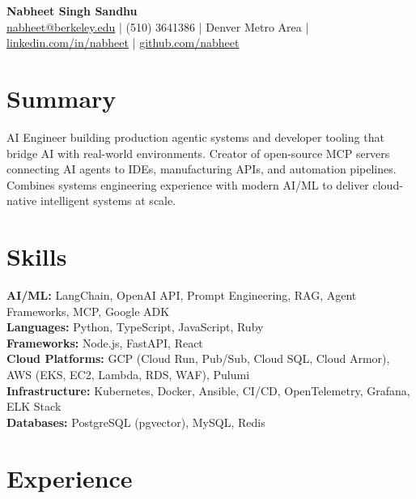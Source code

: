\documentclass[11pt,letterpaper]{article}
\begin{document}
{\Huge \bfseries Nabheet Singh Sandhu} \\[4pt]
\href{mailto:nabheet@berkeley.edu}{nabheet@berkeley.edu} \; | \;
(510) 364\textendash{}1386 \; |\;
Denver Metro Area \;|\;
\href{https://linkedin.com/in/nabheet}{linkedin.com/in/nabheet} \;|\;
\href{https://github.com/nabheet}{github.com/nabheet}

\section*{Summary}
AI Engineer building production agentic systems and developer tooling that bridge AI with real-world environments. Creator of open-source MCP servers connecting AI agents to IDEs, manufacturing APIs, and automation pipelines. Combines systems engineering experience with modern AI/ML to deliver cloud-native intelligent systems at scale.

\section*{Skills}
\textbf{AI/ML:} LangChain, OpenAI API, Prompt Engineering, RAG, Agent Frameworks, MCP, Google ADK \\
\textbf{Languages:} Python, TypeScript, JavaScript, Ruby \\
\textbf{Frameworks:} Node.js, FastAPI, React \\
\textbf{Cloud Platforms:} GCP (Cloud Run, Pub/Sub, Cloud SQL, Cloud Armor), AWS (EKS, EC2, Lambda, RDS, WAF), Pulumi \\
\textbf{Infrastructure:} Kubernetes, Docker, Ansible, CI/CD, OpenTelemetry, Grafana, ELK Stack \\
\textbf{Databases:} PostgreSQL (pgvector), MySQL, Redis \\

\section*{Experience}
\end{document}
